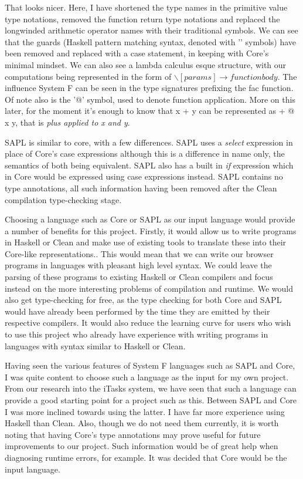 \documentclass[11pt]{article}
\begin{document}
\noindent That looks nicer. Here, I have shortened the type names in the
primitive value type notations, removed the function return type notations
and replaced the longwinded arithmetic operator names with their traditional
symbols. We can see that the guards (Haskell pattern matching syntax, denoted
with '\textbar' symbols) have been removed and replaced with a case statement, in
keeping with Core's minimal mindset. We can also see a lambda calculus esque
structure, with our computations being represented in the form of \( \backslash
 [params] \rightarrow function body\). The influence System F can be seen in
 the type signatures prefixing the fac function. Of note also is the '@' symbol, used
 to denote function application. More on this later, for the moment it's enough
 to know that x + y can be represented as + @ x y, that is \emph{plus applied to
 x and y}.
 
SAPL is similar to core, with a few differences. SAPL uses a \emph{select} 
expression in place of Core's case expressions although this is a difference in name
only, the semantics of both being equivalent. SAPL also has a built in \emph{if}
expression which in Core would be expressed using case expressions instead. SAPL
contains no type annotations, all such information having been removed after the
Clean compilation type-checking stage.

Choosing a language such as Core or SAPL as our input language would provide
a number of benefits for this project. Firstly, it would allow us to write
programs in Haskell or Clean and make use of existing tools to translate these
into their Core-like representations.. This would mean that we can write our browser
programs in languages with pleasant high level syntax. We could leave the 
parsing of these programs to existing Haskell or Clean compilers and focus 
instead on the more interesting problems of compilation and runtime. We would
also get type-checking for free, as the type checking for both Core and SAPL 
would have already been performed by the time they are emitted by their respective
compilers. It would also reduce the learning curve for users who wish to use
this project who already have experience with writing programs in languages
with syntax similar to Haskell or Clean.
 
Having seen the various features of System F languages such as SAPL and Core, I
was quite content to choose such a language as the input for my own project. 
From our research into the iTasks system, we have seen that such a language 
can provide a good starting point for a project such as this. Between SAPL and
Core I was more inclined towards using the latter. I have far more experience
using Haskell than Clean. Also, though we do not need them currently, it is
worth noting that having Core's type annotations may prove useful for future
improvements to our project. Such information would be of great help when 
diagnosing runtime errors, for example. It was decided that Core would be the
input language.
\end{document}
